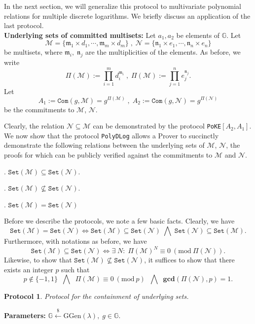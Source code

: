 \documentclass[11pt, lettersize, notitlepage, leqno, footskip=0.6cm]{article}
\newcommand{\pl}{\prod\limits}
\newcommand{\ttt}{\texttt}
\newcommand{\sett}{\ttt{Set}}
\newcommand{\LRA}{\Longleftrightarrow}
\newcommand{\mf}{\mathfrak}
\newcommand{\mc}{\mathcal}
\newcommand{\mb}{\mathbb}
\newcommand{\mbf}{\mathbf}
\newcommand{\mr}{\mathrm}
\newcommand{\mfm}{\mathfrak{m}}
\newcommand{\mfn}{\mathfrak{n}}
\newcommand{\lamb}{\lambda}
\newcommand{\sub}{\subseteq}
\newcommand{\nsub}{\nsubseteq}
\newcommand{\vs}{\vspace{-0.15cm}}
\newcommand{\noin}{\noindent}
\newcommand{\Mod}[1]{\ (\mathrm{mod}\ #1)}
\newcommand{\GCD}{\mbf{gcd}}
\newtheorem{Prot}[Thm]{Protocol}
\numberwithin{equation}{section}
\begin{document}
\noin In the next section, we will generalize this protocol to multivariate polynomial relations for multiple discrete logarithms. We briefly discuss an application of the last protocol.\\

\noin \textbf{Underlying sets of committed multisets:} Let $a_1,a_2$ be elements of $\mb{G}$. Let \vs $$\mc{M} = \{\mf{m}_1\times d_1,\cdots, \mf{m}_m\times d_m \}\;,\;\mc{N} = \{\mf{n}_1\times e_1,\cdots, \mf{n}_n\times e_n \}$$ be multisets, where $\mf{m}_i,\;\mf{n}_j$ are the multiplicities of the elements. As before, we write \vs $$\Pi(\mc{M}):= \pl_{i=1}^m d_i^{\mfm_i}\;,\; \Pi(\mc{M}):= \pl_{j=1}^n e_j^{\mfn_j}.$$ Let \vs $$A_1:= \ttt{Com}(g, \mc{M}) =  g^{\Pi(\mc{M})}\;,\; A_2:= \ttt{Com}(g, \mc{N}) = g^{\Pi(\mc{N})}$$ be the commitments to $\mc{M}$, $\mc{N}$.

Clearly, the relation $\mc{N}\sub \mc{M}$ can be demonstrated by the protocol \verb|PoKE|$[A_2, A_1]$. We now show that the protocol \verb|PolyDLog| allows a Prover to succinctly demonstrate the following relations between the underlying sets of $\mc{M}$, $\mc{N}$, the proofs for which can be publicly verified against the commitments to $\mc{M}$ and $\mc{N}$.\vspace{0.1cm}

\noin 1. $\sett(\mc{M})\sub \sett(\mc{N})$.

\noin 2. $\sett(\mc{M})\nsub \sett(\mc{N})$.

\noin 3. $\sett(\mc{M}) = \sett(\mc{N})$ \vspace{0.1cm}

\noin Before we describe the protocols, we note a few basic facts. Clearly, we have \vs $$\sett(\mc{M}) = \sett(\mc{N})\LRA \sett(\mc{M}) \sub \sett(\mc{N})\;\bigwedge\; \sett(\mc{N}) \sub \sett(\mc{M}).$$ Furthermore, with notations as before, we have \vs $$\sett(\mc{M})\sub \sett(\mc{N})\LRA \exists\; N:\;\Pi(\mc{M})^N\equiv 0\Mod{\Pi(\mc{N})}.$$ Likewise, to show that $\sett(\mc{M})\nsub \sett(\mc{N})$, it suffices to show that there exists an integer $p$ such that $$p\notin \{-1,1\}   \;\;\bigwedge\;\;\Pi(\mc{M})\equiv 0\Mod{p} \;\;\bigwedge\;\; \GCD(\Pi(\mc{N}),{p})=1.$$ 


\begin{Prot} Protocol for the containment of underlying sets.\end{Prot} \vspace{-0.3cm}

\noin \textbf{Parameters:} $\mb{G}\xleftarrow{\$} \mr{GGen}(\lamb), \; g\in \mb{G}$.
\end{document}
